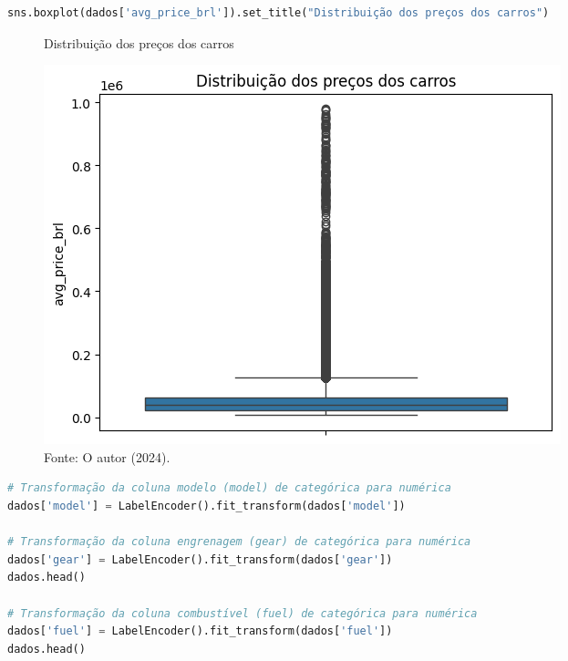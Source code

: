 \begin{lstlisting}[language=Python, style=input]
sns.boxplot(dados['avg_price_brl']).set_title("Distribuição dos preços dos carros") 
\end{lstlisting}
\begin{figure}[H]
\centering
\caption{Distribuição dos preços dos carros}
\includegraphics[width=.8\linewidth]{apendices/fig/2_IAA002_6.png}
\caption*{Fonte: O autor (2024).}
\end{figure}
\begin{lstlisting}[language=Python, style=input]
# Transformação da coluna modelo (model) de categórica para numérica
dados['model'] = LabelEncoder().fit_transform(dados['model']) 

# Transformação da coluna engrenagem (gear) de categórica para numérica
dados['gear'] = LabelEncoder().fit_transform(dados['gear']) 
dados.head()

# Transformação da coluna combustível (fuel) de categórica para numérica
dados['fuel'] = LabelEncoder().fit_transform(dados['fuel']) 
dados.head()
\end{lstlisting}
